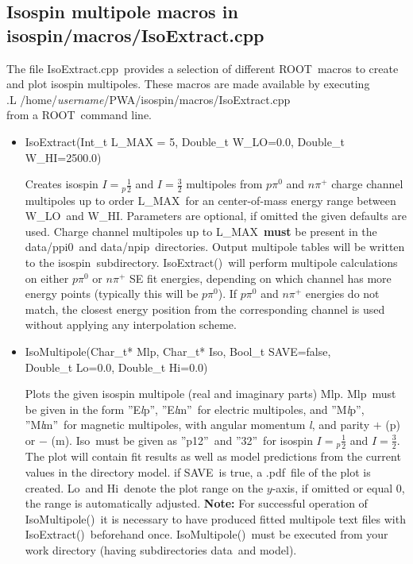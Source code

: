 \documentclass[a4paper,10pt]{article}
\def\tt{\ttfamily}
\def\rm{\rmfamily}
\begin{document}
\subsection{Isospin multipole macros in \tt isospin/macros/IsoExtract.cpp\rm}

The file \tt IsoExtract.cpp\rm\ provides a selection of different \tt ROOT\rm\ macros to create and plot isospin
multipoles. These macros are made available by executing\\
\tt .L /home/\textit{username}/PWA/isospin/macros/IsoExtract.cpp\rm\\
from a \tt ROOT\rm\ command line.

\begin{itemize}
\item
\tt IsoExtract(Int\_t L\_MAX = 5, Double\_t W\_LO=0.0, Double\_t W\_HI=2500.0)\rm

Creates isospin $I = {}_p\frac{1}{2}$ and $I = \frac{3}{2}$ multipoles from $p \pi^0$ and
$n \pi^+$ charge channel multipoles up to order \tt L\_MAX\rm\ for an center-of-mass energy range
between \tt W\_LO\rm\ and \tt W\_HI\rm. Parameters are optional, if omitted the given defaults are used.
Charge channel multipoles up to \tt L\_MAX\rm\ \textbf{must} be present in the 
\tt data/ppi0\rm\ and \tt data/npip\rm\ directories. Output multipole tables will be written to the 
\tt isospin\rm\ subdirectory.
\tt IsoExtract()\rm\ will perform multipole calculations on either $p \pi^0$ or $n \pi^+$
SE fit energies, depending on which channel has more energy points (typically this will be $p \pi^0$).
If $p \pi^0$ and $n \pi^+$ energies do not match, the closest energy position from the corresponding 
channel is used without applying any interpolation scheme.

\item
\tt IsoMultipole(Char\_t* Mlp, Char\_t* Iso, Bool\_t SAVE=false,\\
\phantom{IsoMultipole(}Double\_t Lo=0.0, Double\_t Hi=0.0)\rm

Plots the given isospin multipole (real and imaginary parts) \tt Mlp\rm.
\tt Mlp\rm\ must be given in the form \tt ''E\textit{l}p''\rm,
\tt ''E\textit{l}m''\rm\ 
for electric multipoles, and
\tt ''M\textit{l}p''\rm,
\tt ''M\textit{l}m''\rm\ 
for magnetic multipoles, with angular momentum \tt\textit{l}\rm, and parity
$+$ (\tt p\rm) or $-$ (\tt m\rm). \tt Iso\rm\ must be given as \tt ''p12''\rm\ and \tt ''32''\rm\
for isospin $I = {}_p\frac{1}{2}$ and $I = \frac{3}{2}$.
The plot will contain fit results as well as model predictions from the current
values in the directory \tt model\rm.
if \tt SAVE\rm\ is true, a \tt.pdf\rm\ file of the plot is created. \tt Lo\rm\ and \tt Hi\rm\ denote the plot range on the $y$-axis, 
if omitted or equal 0, the range is automatically adjusted.
\textbf{Note:} For successful operation of \tt IsoMultipole()\rm\ it is necessary to have produced
fitted multipole text files with \tt IsoExtract()\rm\ beforehand once. \tt IsoMultipole()\rm\ must be executed from your
work directory (having subdirectories \tt data\rm\ and \tt model\rm).
\end{itemize}
\end{document}
